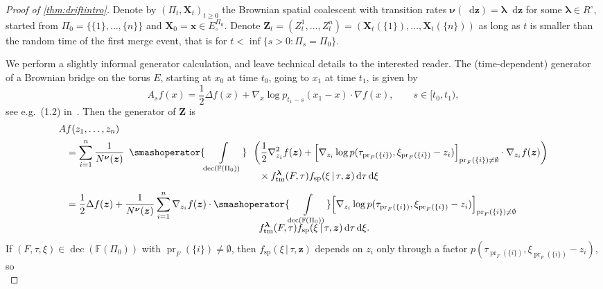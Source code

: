 \documentclass[reqno,draft]{amsart}
\numberwithin{equation}{section}
\theoremstyle{plain}
\theoremstyle{remark}
\newcommand*\diff{\mathop{}\!\mathrm{d}}
\DeclareMathOperator{\pr}{pr}
\newcommand{\fpart}{\Pi} %
\newcommand{\rates}{R^\circ} %
\DeclareMathOperator{\dcb}{dec}
\newcommand{\ftm}{f_\mathrm{tm}^{\boldsymbol \lambda}}
\newcommand{\fsp}{f_\mathrm{sp}}
\begin{document}
\begin{proof}[Proof of \cref{thm:driftintro}]
    Denote by $(\fpart_t,\boldsymbol X_t)_{t \ge 0}$ the Brownian spatial coalescent with transition rates $\boldsymbol \nu(\diff \boldsymbol z)  = \boldsymbol \lambda \diff \boldsymbol z$ for some $\boldsymbol \lambda \in \rates$, started from $\fpart_0 = \{\{1\}, \ldots ,\{n\}\}$ and $\boldsymbol X_0 = \boldsymbol x \in E^{\fpart_0}_\circ $. Denote $\boldsymbol Z_t = (Z_t^1, \ldots ,Z_t^n) = (\boldsymbol X_t(\{1\}), \ldots ,\boldsymbol X_t(\{n\}))$ as long as $t$ is smaller than the random time of the first merge event, that is for $t < \inf \{ s > 0\colon \fpart_s = \fpart_0\}$.

    We perform a slightly informal generator calculation, and leave technical details to the interested reader. The (time-dependent) generator of a Brownian bridge on the torus $E$, starting at $x_0$ at time $t_0$, going to $x_1$ at time $t_1$, is given by \[
        A_s f(x) = \frac{1}{2}\Delta f(x) + \nabla_x \log p_{t_1-s}(x_1-x) \cdot \nabla f(x),\qquad s \in [t_0,t_1),
    \] see e.g.~(1.2) in~\cite{bbgenerator}. Then the generator of $\boldsymbol Z$ is
    \begin{align*}
        A& f(z_1, \ldots ,z_n) \\
         &= \sum_{i=1}^n \frac{1}{N^{\boldsymbol \nu}(\boldsymbol z)} \,\,\,\smashoperator{\int\limits_{\dcb(\mathbb{F}(\fpart_0))}}\,\,\, \left( \frac{1}{2}\nabla_{z_i}^2 f(\boldsymbol z) + \Big[ \nabla _{z_i} \log p(\tau_{\pr_F(\{i\})},\xi_{\pr_F(\{i\})} - z_i)\Big]_{\pr_F(\{i\}) \neq \emptyset } \cdot \nabla_{z_i} f(\boldsymbol z) \right) \\[-7pt]
        &\hspace{7cm} \times \ftm(F,\tau) \fsp(\xi \,\vert\,\tau,\boldsymbol z) \diff \tau\diff \xi\\[5pt]
        &= \frac{1}{2} \Delta f(\boldsymbol z) + \frac{1}{N^{\boldsymbol \nu}(\boldsymbol z)} \sum_{i=1}^n \nabla_{z_i} f(\boldsymbol z) \cdot \smashoperator{\int\limits_{\dcb(\mathbb{F}(\fpart_0))}} \Big[ \nabla _{z_i} \log p(\tau_{\pr_F(\{i\})},\xi_{\pr_F(\{i\})} - z_i)\Big]_{\pr_F(\{i\}) \neq \emptyset }\\[-7pt]
        &\hspace{7cm} \ftm(F,\tau) \fsp(\xi \,\vert\,\tau,\boldsymbol z) \diff \tau\diff \xi.
    \end{align*}
    If $(F,\tau,\xi) \in \dcb(\mathbb{F}(\fpart_0))$ with $\pr_F(\{i\}) \neq \emptyset $, then $\fsp(\xi \,\vert\,\tau,\boldsymbol z)$ depends on $z_i$ only through a factor $p(\tau_{\pr_F(\{i\})},\xi_{\pr_F(\{i\})} - z_i)$, so \[
\]
\end{proof}
\end{document}
